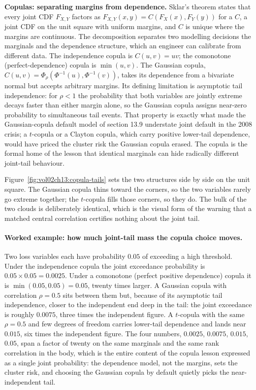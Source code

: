 \begin{mastery}
\textbf{Copulas: separating margins from dependence.} Sklar's theorem
states that every joint CDF $F_{X, Y}$ factors as $F_{X, Y}(x, y) =
C(F_{X}(x), F_{Y}(y))$ for a  $C$, a joint CDF on the
unit square with uniform margins, and $C$ is unique where the margins
are continuous. The decomposition separates two modelling decisions
the marginals and the dependence structure, which an engineer can
calibrate from different data. The independence copula is $C(u, v) =
uv$; the comonotone (perfect-dependence) copula is $\min(u, v)$. The
Gaussian copula, $C(u, v) = \Phi_{\rho}(\Phi^{-1}(u), \Phi^{-1}(v))$,
takes its dependence from a bivariate normal but accepts arbitrary
margins. Its defining limitation is asymptotic tail independence: for
$\rho < 1$ the probability that both variables are jointly extreme
decays faster than either margin alone, so the Gaussian copula assigns
near-zero probability to simultaneous tail events. That property is
exactly what made the Gaussian-copula default model of section 13.9
understate joint default in the 2008 crisis; a $t$-copula or a
Clayton copula, which carry positive lower-tail dependence, would have
priced the cluster risk the Gaussian copula erased. The copula is the
formal home of the lesson that identical marginals can hide radically
different joint-tail behaviour.
\end{mastery}



Figure~\ref{fig:vol02ch13:copula-tails} sets the two structures side by
side on the unit square. The Gaussian copula thins toward the corners,
so the two variables rarely go extreme together; the $t$-copula fills
those corners, so they do. The bulk of the two clouds is deliberately
identical, which is the visual form of the warning that a matched
central correlation certifies nothing about the joint tail.

\paragraph{Worked example: how much joint-tail mass the copula choice
moves.} Two loss variables each have probability $0.05$ of exceeding a
high threshold. Under the independence copula the joint exceedance
probability is $0.05 \times 0.05 = 0.0025$. Under a comonotone (perfect
positive dependence) copula it is $\min(0.05, 0.05) = 0.05$, twenty
times larger. A Gaussian copula with correlation $\rho = 0.5$ sits
between them but, because of its asymptotic tail independence, closer to
the independent end deep in the tail: the joint exceedance is roughly
$0.0075$, three times the independent figure. A $t$-copula with the same
$\rho = 0.5$ and few degrees of freedom carries lower-tail dependence and
lands near $0.015$, six times the independent figure. The four numbers,
$0.0025$, $0.0075$, $0.015$, $0.05$, span a factor of twenty on the same
marginals and the same rank correlation in the body, which is the entire
content of the copula lesson expressed as a single joint probability: the
dependence model, not the margins, sets the cluster risk, and choosing
the Gaussian copula by default quietly picks the near-independent tail.

